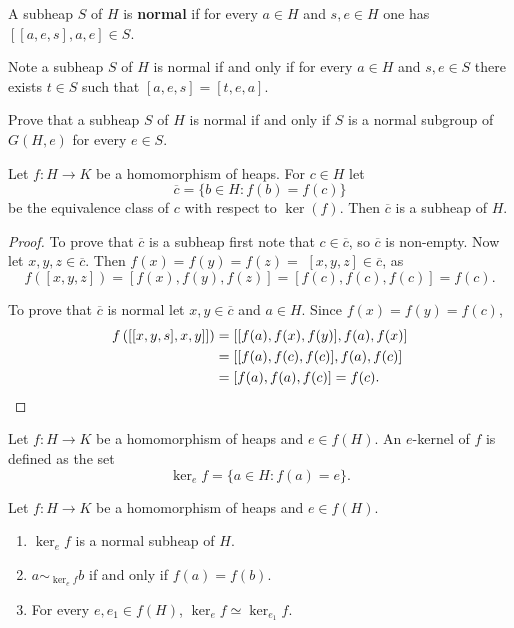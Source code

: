\documentclass{svmult}
\begin{document}
\begin{definition}
    A subheap $S$ of $H$ is \textbf{normal} if 
    for every $a\in H$ and $s,e\in H$ one has 
    $[[a,e,s],a,e]\in S$.  
\end{definition}

Note a subheap $S$ of $H$ is normal if and only if 
for every $a\in H$ and $s,e\in S$ there exists 
$t\in S$ such that $[a,e,s]=[t,e,a]$.
    
\begin{exercise}
    Prove that a subheap $S$ of $H$ is normal if and only if 
    $S$ is a normal subgroup of $G(H,e)$ for every $e\in S$. 
\end{exercise}

\begin{theorem}
    Let $f\colon H\to K$ be a homomorphism of heaps. For $c\in H$
    let 
    \[
    \overline{c}=\{b\in H:f(b)=f(c)\}
    \]
    be the equivalence class of $c$ with respect to $\ker(f)$. 
    Then $\overline{c}$ is a subheap of $H$.  
\end{theorem}

\begin{proof}
    To prove that $\overline{c}$ is a subheap first note that 
    $c\in\overline{c}$, so $\overline{c}$ is non-empty. 
    Now let $x,y,z\in\overline{c}$. 
    Then $f(x)=f(y)=f(z)=$ 
    $[x,y,z]\in\overline{c}$, as
    \[
    f([x,y,z])=[f(x),f(y),f(z)]=[f(c),f(c),f(c)]=f(c).
    \]
    
    To prove that $\overline{c}$ is normal let $x,y\in\overline{c}$ and $a\in H$. 
    Since $f(x)=f(y)=f(c)$, 
    \begin{align*}
        f\left(\left[[x,y,s],x,y]\right]\right)&=\left[[f(a),f(x),f(y)],f(a),f(x)\right]\\ 
        &=\left[[f(a),f(c),f(c)],f(a),f(c)\right]\\
        &=[f(a),f(a),f(c)]=f(c).\qedhere
    \end{align*}
\end{proof}

\begin{definition}
    Let $f\colon H\to K$ be a homomorphism of heaps and $e\in f(H)$. 
    An $e$-kernel of $f$ is defined as the set
    \[
    \ker_ef=\{a\in H:f(a)=e\}.
    \]
\end{definition}

\begin{theorem}
    Let $f\colon H\to K$ be a homomorphism of heaps and $e\in f(H)$. 
    \begin{enumerate}
        \item $\ker_ef$ is a normal subheap of $H$. 
        \item $a\sim_{\ker_ef}b$ if and only if $f(a)=f(b)$. 
        \item For every $e,e_1\in f(H)$, $\ker_ef\simeq\ker_{e_1}f$. 
    \end{enumerate}
\end{theorem}
\end{document}

